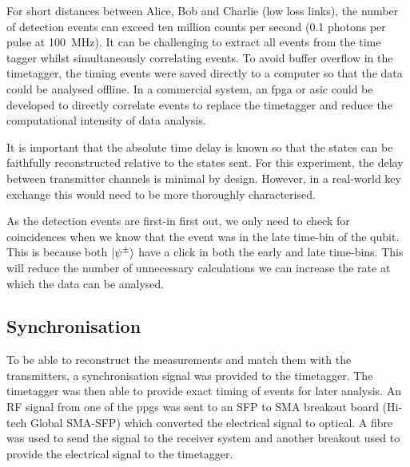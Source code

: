 For short distances between Alice, Bob and Charlie (low loss links), the number of detection events can exceed ten million counts per second (0.1 photons per pulse at \SI{100}{MHz}). It can be challenging to extract all events from the time tagger whilst simultaneously correlating events. To avoid buffer overflow in the timetagger, the timing events were saved directly to a computer so that the data could be analysed offline. In a commercial system, an \ac{fpga} or \ac{asic} could be developed to directly correlate events to replace the timetagger and reduce the computational intensity of data analysis. 

It is important that the absolute time delay is known so that the states can be faithfully reconstructed relative to the states sent. For this experiment, the delay between transmitter channels is minimal by design. However, in a real-world key exchange this would need to be more thoroughly characterised. 

As the detection events are first-in first out, we only need to check for coincidences when we know that the event was in the late time-bin of the qubit. This is because both $\ket{\psi^\pm}$ have a click in both the early and late time-bins. This will reduce the number of unnecessary calculations we can increase the rate at which the data can be analysed.

%


\subsection{Synchronisation}

To be able to reconstruct the measurements and match them with the transmitters, a synchronisation signal was provided to the timetagger. The timetagger was then able to provide exact timing of events for later analysis. An RF signal from one of the \acp{ppg} was sent to an SFP to SMA breakout board (Hi-tech Global SMA-SFP) which converted the electrical signal to optical. A fibre was used to send the signal to the receiver system and another breakout used to provide the electrical signal to the timetagger. 

